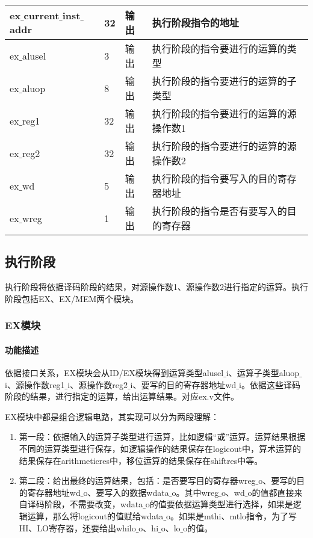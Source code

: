 \begin{table}[H]
\begin{tabular}{|l|l|l|l|}
		\hline
		ex$\_$current$\_$inst$\_$addr & 32 & 输出 & 执行阶段指令的地址 \\
		\hline
		ex$\_$alusel & 3 & 输出 & 执行阶段的指令要进行的运算的类型 \\
		\hline
		ex$\_$aluop & 8 & 输出 & 执行阶段的指令要进行的运算的子类型 \\
		\hline
		ex$\_$reg1 & 32 & 输出 & 执行阶段的指令要进行的运算的源操作数1 \\
		\hline
		ex$\_$reg2 & 32 & 输出 & 执行阶段的指令要进行的运算的源操作数2 \\
		\hline
		ex$\_$wd & 5 & 输出 & 执行阶段的指令要写入的目的寄存器地址 \\
		\hline
		ex$\_$wreg & 1 & 输出 & 执行阶段的指令是否有要写入的目的寄存器 \\
		\hline
	\end{tabular}
\end{table}
\subsection{执行阶段}
执行阶段将依据译码阶段的结果，对源操作数1、源操作数2进行指定的运算。执行阶段包括EX、EX/MEM两个模块。
\subsubsection{EX模块}
\paragraph{功能描述}
\quad

\quad

依据接口关系，EX模块会从ID/EX模块得到运算类型alusel$\_$i、运算子类型aluop$\_$i、源操作数reg1$\_$i、源操作数reg2$\_$i、要写的目的寄存器地址wd$\_$i。依据这些译码阶段的结果，进行指定的运算，给出运算结果。对应ex.v文件。

EX模块中都是组合逻辑电路，其实现可以分为两段理解：
\begin{enumerate}[(1)]
	\item 第一段：依据输入的运算子类型进行运算，比如逻辑“或”运算。运算结果根据不同的运算类型进行保存，如逻辑操作的结果保存在logicout中，算术运算的结果保存在arithmeticres中，移位运算的结果保存在shiftres中等。
	
	\item 第二段：给出最终的运算结果，包括：是否要写目的寄存器wreg$\_$o、要写的目的寄存器地址wd$\_$o、要写入的数据wdata$\_$o。其中wreg$\_$o、wd$\_$o的值都直接来自译码阶段，不需要改变，wdata$\_$o的值要依据运算类型进行选择，如果是逻辑运算，那么将logicout的值赋给wdata$\_$o。如果是mthi、mtlo指令，为了写HI、LO寄存器，还要给出whilo$\_$o、hi$\_$o、lo$\_$o的值。
\end{enumerate}

